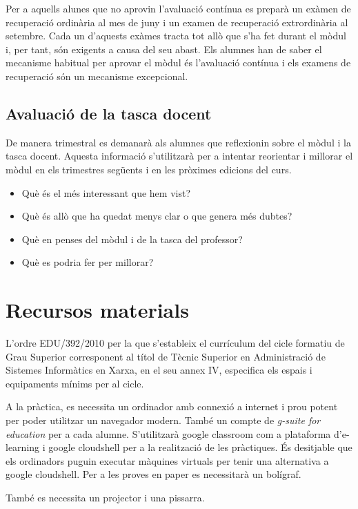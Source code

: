 \documentclass[catalan, a4paper, 12pt, titlepage]{article}
\begin{document}
Per a aquells alunes que no aprovin l'avaluació contínua es preparà un exàmen de recuperació ordinària al mes de juny i un examen de recuperació extrordinària al setembre. Cada un d'aquests exàmes tracta tot allò que s'ha fet durant el mòdul i, per tant, són exigents a causa del seu abast. Els alumnes han de saber el mecanisme habitual per aprovar el mòdul és l'avaluació contínua i els examens de recuperació són un mecanisme excepcional.

\subsection{Avaluació de la tasca docent}

De manera trimestral es demanarà als alumnes que reflexionin sobre el mòdul i la tasca docent. Aquesta informació s'utilitzarà per a intentar reorientar i millorar el mòdul en els trimestres següents i en les pròximes edicions del curs. 

\begin{itemize}
	\item Què és el més interessant que hem vist?
	\item Què és allò que ha quedat menys clar o que genera més dubtes?
	\item Què en penses del mòdul i de la tasca del professor?
	\item Què es podria fer per millorar?
\end{itemize}

\section{Recursos materials}

L'ordre EDU/392/2010 per la que s'estableix el currículum del cicle formatiu de Grau Superior corresponent al títol de Tècnic Superior en Administració de Sistemes Informàtics en Xarxa, en el seu annex IV, especifica els espais i equipaments mínims per al cicle.

A la pràctica, es necessita un ordinador amb connexió a internet i prou potent per poder utilitzar un navegador modern. També un compte de \emph{g-suite for education} per a cada alumne. S'utilitzarà google classroom com a plataforma d'e-learning i google cloudshell per a la realització de les pràctiques. És desitjable que els ordinadors puguin executar màquines virtuals per tenir una alternativa a google cloudshell. Per a les proves en paper es necessitarà un bolígraf.

També es necessita un projector i una pissarra.
\end{document}
